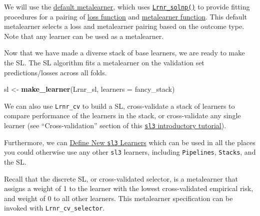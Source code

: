 \documentclass[12pt, krantz2,]{krantz}
\newenvironment{Shaded}{\begin{snugshade}}{\end{snugshade}}
\newcommand{\DataTypeTok}[1]{\textcolor[rgb]{0.27,0.27,0.27}{#1}}
\newcommand{\KeywordTok}[1]{\textcolor[rgb]{0.27,0.27,0.27}{\textbf{#1}}}
\newcommand{\NormalTok}[1]{#1}
\newcommand{\OperatorTok}[1]{\textcolor[rgb]{0.43,0.43,0.43}{\textbf{#1}}}
\newcommand{\StringTok}[1]{\textcolor[rgb]{0.5,0.5,0.5}{#1}}
\theoremstyle{definition}
\theoremstyle{definition}
\theoremstyle{definition}
\newcommand{\1}{\mathbbm{1}}
\begin{document}
We will use the \href{https://tlverse.org/sl3/reference/default_metalearner.html}{default
metalearner}, which
uses \href{https://tlverse.org/sl3/reference/Lrnr_solnp.html}{\texttt{Lrnr\_solnp()}} to
provide fitting procedures for a pairing of \href{https://tlverse.org/sl3/reference/loss_functions.html}{loss
function} and
\href{https://tlverse.org/sl3/reference/metalearners.html}{metalearner function}.
This default metalearner selects a loss and metalearner pairing based on the
outcome type. Note that any learner can be used as a metalearner.

Now that we have made a diverse stack of base learners, we are ready to make
the SL. The SL algorithm fits a metalearner on the validation set
predictions/losses across all folds.

\begin{Shaded}
\begin{Highlighting}[]
\NormalTok{sl <-}\StringTok{ }\KeywordTok{make_learner}\NormalTok{(Lrnr_sl, }\DataTypeTok{learners =}\NormalTok{ fancy_stack)}
\end{Highlighting}
\end{Shaded}

We can also use \texttt{Lrnr\_cv} to build a SL, cross-validate a stack of
learners to compare performance of the learners in the stack, or cross-validate
any single learner (see ``Cross-validation'' section of this \href{https://tlverse.org/sl3/articles/intro_sl3.html}{\texttt{sl3}
introductory tutorial}).

Furthermore, we can \href{https://tlverse.org/sl3/articles/custom_lrnrs.html}{Define New \texttt{sl3}
Learners} which can be used
in all the places you could otherwise use any other \texttt{sl3} learners, including
\texttt{Pipelines}, \texttt{Stacks}, and the SL.

Recall that the discrete SL, or cross-validated selector, is a metalearner that
assigns a weight of 1 to the learner with the lowest cross-validated empirical
risk, and weight of 0 to all other learners. This metalearner specification can
be invoked with \texttt{Lrnr\_cv\_selector}.

\begin{Shaded}
\end{Shaded}
\end{document}
